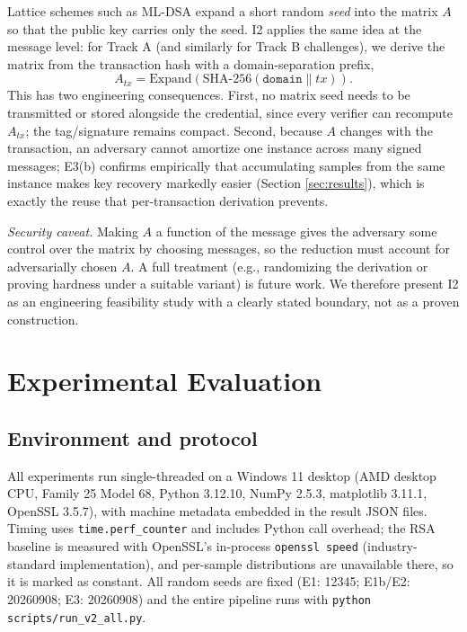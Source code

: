 \documentclass[11pt]{article}
\begin{document}
Lattice schemes such as ML-DSA expand a short random \emph{seed} into the
matrix $A$ so that the public key carries only the seed.  I2 applies the same
idea at the message level: for Track A (and similarly for Track B challenges),
we derive the matrix from the transaction hash with a domain-separation prefix,
\[
A_{tx} = \text{Expand}(\mathrm{SHA\text{-}256}(\texttt{domain} \| tx)).
\]
This has two engineering consequences.  First, no matrix seed needs to be
transmitted or stored alongside the credential, since every verifier can
recompute $A_{tx}$; the tag/signature remains compact.  Second, because $A$
changes with the transaction, an adversary cannot amortize one instance across
many signed messages; E3(b) confirms empirically that accumulating samples from
the same instance makes key recovery markedly easier (Section
\ref{sec:results}), which is exactly the reuse that per-transaction derivation
prevents.

\emph{Security caveat.} Making $A$ a function of the message gives the
adversary some control over the matrix by choosing messages, so the reduction
must account for adversarially chosen $A$.  A full treatment (e.g., randomizing
the derivation or proving hardness under a suitable variant) is future work.
We therefore present I2 as an engineering feasibility study with a clearly
stated boundary, not as a proven construction.

\section{Experimental Evaluation}\label{sec:eval}

\subsection{Environment and protocol}
All experiments run single-threaded on a Windows 11 desktop (AMD desktop CPU, Family 25 Model 68,
Python 3.12.10, NumPy 2.5.3, matplotlib 3.11.1, OpenSSL 3.5.7), with machine
metadata embedded in the result JSON files.  Timing uses
\verb|time.perf_counter| and includes Python call overhead; the RSA baseline is
measured with OpenSSL's in-process \verb|openssl speed| (industry-standard
implementation), and per-sample distributions are unavailable there, so it is
marked as constant.  All random seeds are fixed (E1: 12345; E1b/E2: 20260908; E3: 20260908) and the
entire pipeline runs with
\verb|python scripts/run_v2_all.py|.
\end{document}
